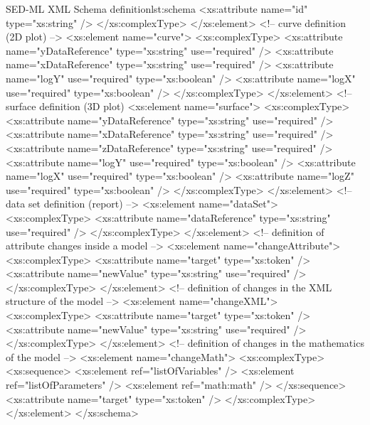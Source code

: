 \begin{myXmlLst}{SED-ML XML Schema definition}{lst:schema}
  <xs:attribute name="id" type="xs:string" />
 </xs:complexType>
</xs:element>
<!-- curve definition (2D plot) -->
<xs:element name="curve">
 <xs:complexType>
  <xs:attribute name="yDataReference" type="xs:string" use="required" />
  <xs:attribute name="xDataReference" type="xs:string" use="required" />
  <xs:attribute name="logY" use="required" type="xs:boolean" />
  <xs:attribute name="logX" use="required" type="xs:boolean" />
 </xs:complexType>
</xs:element>
<!-- surface definition (3D plot)
<xs:element name="surface">
 <xs:complexType>
  <xs:attribute name="yDataReference" type="xs:string" use="required" />
  <xs:attribute name="xDataReference" type="xs:string" use="required" />
  <xs:attribute name="zDataReference" type="xs:string" use="required" />
  <xs:attribute name="logY" use="required" type="xs:boolean" />
  <xs:attribute name="logX" use="required" type="xs:boolean" />
  <xs:attribute name="logZ" use="required" type="xs:boolean" />
 </xs:complexType>
</xs:element>
<!-- data set definition (report) -->
<xs:element name="dataSet">
 <xs:complexType>
  <xs:attribute name="dataReference" type="xs:string" use="required" />
 </xs:complexType>
</xs:element>
<!-- definition of attribute changes inside a model -->
<xs:element name="changeAttribute">
 <xs:complexType>
  <xs:attribute name="target" type="xs:token" />
  <xs:attribute name="newValue" type="xs:string" use="required" />
 </xs:complexType>
</xs:element>
<!-- definition of changes in the XML structure of the model -->
<xs:element name="changeXML">
 <xs:complexType>
  <xs:attribute name="target" type="xs:token" />
  <xs:attribute name="newValue" type="xs:string" use="required" />
 </xs:complexType>
</xs:element>
<!-- definition of changes in the mathematics of the model -->
<xs:element name="changeMath">
 <xs:complexType>
  <xs:sequence>
   <xs:element ref="listOfVariables" />
   <xs:element ref="listOfParameters" />
   <xs:element ref="math:math" />
  </xs:sequence>
  <xs:attribute name="target" type="xs:token" />
 </xs:complexType>
</xs:element>
</xs:schema>
\end{myXmlLst}

